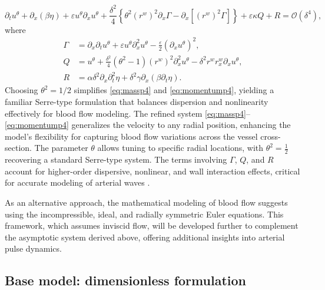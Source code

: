 \documentclass[alpha-refs, 12pt]{wiley-article}
\renewcommand{\O}{\mathcal{O}}
\newcommand{\eps}{\varepsilon}
\begin{document}
\begin{equation}\label{eq:momentump4}
  \partial_t u^\theta + \partial_x (\beta \eta) + \eps u^\theta \partial_x u^\theta + \frac{\delta^2}{4} \left\{ \theta^2 (r^w)^2 \partial_x \Gamma - \partial_x [(r^w)^2 \Gamma] \right\} + \eps \kappa Q + R = \O(\delta^4),
\end{equation}
where
\begin{equation}\label{eq:gamman}
\begin{aligned}
  \Gamma &= \partial_x \partial_t u^\theta + \eps u^\theta \partial_x^2 u^\theta - \frac{\eps}{2} (\partial_x u^\theta)^2, \\
  Q &= u^\theta + \frac{\delta^2}{4} (\theta^2 - 1) (r^w)^2 \partial_x^2 u^\theta - \delta^2 r^w r^w_x \partial_x u^\theta, \\
  R &= \alpha \delta^2 \partial_x \partial_t^2 \eta + \delta^2 \gamma \partial_x (\beta \partial_t \eta).
\end{aligned}
\end{equation}
Choosing $\theta^2 = {1}/{2}$ simplifies \eqref{eq:massp4} and \eqref{eq:momentump4}, yielding a familiar Serre-type formulation that balances dispersion and nonlinearity effectively for blood flow modeling. The refined system \eqref{eq:massp4}--\eqref{eq:momentump4} generalizes the velocity to any radial position, enhancing the model's flexibility for capturing blood flow variations across the vessel cross-section. The parameter $\theta$ allows tuning to specific radial locations, with $\theta^2 = \frac{1}{2}$ recovering a standard Serre-type system. The terms involving $\Gamma$, $Q$, and $R$ account for higher-order dispersive, nonlinear, and wall interaction effects, critical for accurate modeling of arterial waves \citep{Mitsotakis2019}.

As an alternative approach, the mathematical modeling of blood flow suggests using the incompressible, ideal, and radially symmetric Euler equations. This framework, which assumes inviscid flow, will be developed further to complement the asymptotic system derived above, offering additional insights into arterial pulse dynamics.

\subsection{Base model: dimensionless formulation}
\end{document}
